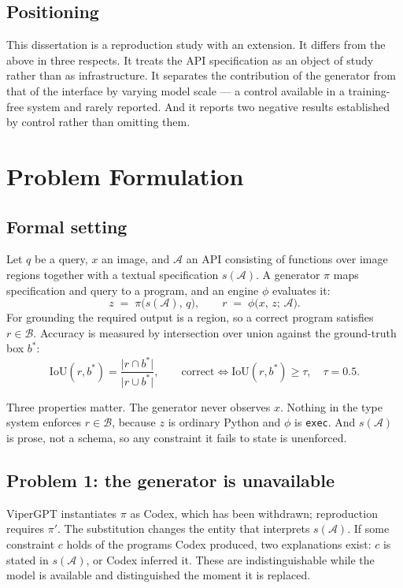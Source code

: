 \documentclass[12pt,a4paper,oneside]{report}
\begin{document}
\section{Positioning}

This dissertation is a reproduction study with an extension. It differs from the above
in three respects. It treats the API specification as an object of study rather than
as infrastructure. It separates the contribution of the generator from that of the
interface by varying model scale --- a control available in a training-free system and
rarely reported. And it reports two negative results established by control rather
than omitting them.

\chapter{Problem Formulation}
\label{ch:problem}

\section{Formal setting}

Let $q$ be a query, $x$ an image, and $\mathcal{A}$ an API consisting of functions
over image regions together with a textual specification $s(\mathcal{A})$. A generator
$\pi$ maps specification and query to a program, and an engine $\phi$ evaluates it:
\[
    z \;=\; \pi\bigl(s(\mathcal{A}),\, q\bigr),
    \qquad
    r \;=\; \phi\bigl(x,\, z;\, \mathcal{A}\bigr).
\]
For grounding the required output is a region, so a correct program satisfies
$r \in \mathcal{B}$. Accuracy is measured by intersection over union against the
ground-truth box $b^{*}$:
\[
    \mathrm{IoU}(r, b^{*}) = \frac{\lvert r \cap b^{*}\rvert}{\lvert r \cup b^{*}\rvert},
    \qquad \text{correct} \iff \mathrm{IoU}(r, b^{*}) \geq \tau, \quad \tau = 0.5 .
\]

Three properties matter. The generator never observes $x$. Nothing in the type system
enforces $r \in \mathcal{B}$, because $z$ is ordinary Python and $\phi$ is
\texttt{exec}. And $s(\mathcal{A})$ is prose, not a schema, so any constraint it fails
to state is unenforced.

\section{Problem 1: the generator is unavailable}

ViperGPT instantiates $\pi$ as Codex, which has been withdrawn; reproduction requires
$\pi'$. The substitution changes the entity that interprets $s(\mathcal{A})$. If some
constraint $c$ holds of the programs Codex produced, two explanations exist: $c$ is
stated in $s(\mathcal{A})$, or Codex inferred it. These are indistinguishable while the
model is available and distinguished the moment it is replaced.
\end{document}
